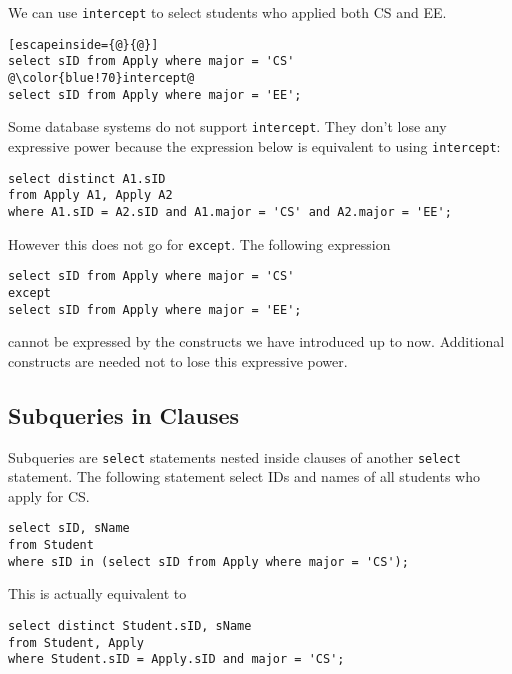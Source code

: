 We can use \texttt{intercept} to select students who applied both CS and EE.
\begin{lstlisting}[escapeinside={@}{@}]
select sID from Apply where major = 'CS'
@\color{blue!70}intercept@
select sID from Apply where major = 'EE';
\end{lstlisting}
Some database systems do not support \texttt{intercept}. They don't lose any expressive power because the expression below is equivalent to using \texttt{intercept}:
\begin{lstlisting}
select distinct A1.sID
from Apply A1, Apply A2
where A1.sID = A2.sID and A1.major = 'CS' and A2.major = 'EE';
\end{lstlisting}

However this does not go for \texttt{except}. The following expression
\begin{lstlisting}
select sID from Apply where major = 'CS'
except
select sID from Apply where major = 'EE';
\end{lstlisting}
cannot be expressed by the constructs we have introduced up to now. Additional constructs are needed not to lose this expressive power.
\subsection{Subqueries in Clauses}
Subqueries are \texttt{select} statements nested inside clauses of another \texttt{select} statement. The following statement select IDs and names of all students who apply for CS.
\begin{lstlisting}
select sID, sName
from Student
where sID in (select sID from Apply where major = 'CS');
\end{lstlisting}
This is actually equivalent to 
\begin{lstlisting}
select distinct Student.sID, sName
from Student, Apply
where Student.sID = Apply.sID and major = 'CS';
\end{lstlisting}
